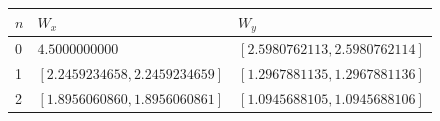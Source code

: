 \begin{tabular}{@{}lll@{}}
\toprule
$n$ & $W_x$ & $W_y$ \\
\midrule
0 & $4.5000000000$ & $[2.5980762113, 2.5980762114]$ \\
1 & $[2.2459234658, 2.2459234659]$ & $[1.2967881135, 1.2967881136]$ \\
2 & $[1.8956060860, 1.8956060861]$ & $[1.0945688105, 1.0945688106]$ \\
\bottomrule
\end{tabular}
